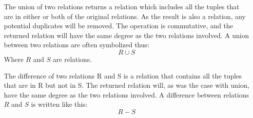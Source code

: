 The union of two relations returns a relation which includes all the tuples that are in either or both of the
original relations. As the result is also a relation, any potential duplicates will be removed. The operation is
commutative, and the returned relation will have the same degree as the two relations involved. A union between
two relations are often symbolized thus:
\begin{equation*}
R \cup S
\end{equation*}
Where $R$ and $S$ are relations.

The difference of two relations R and S is a relation that contains all the tuples that are in R but not in S. The
returned relation will, as was the case with union, have the same degree as the two relations involved. A
difference between relations $R$ and $S$ is written like this:
\begin{equation*}
R - S 
\end{equation*}

